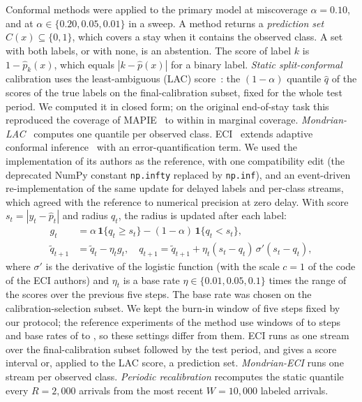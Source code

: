 Conformal methods were applied to the primary model at miscoverage $\alpha = 0.10$, and at $\alpha \in \{0.20, 0.05, 0.01\}$ in a sweep. A method returns a
\emph{prediction set} $\widehat{C}(x) \subseteq \{0,1\}$, which covers a stay when it contains the observed class. A set with both labels, or with none,
is an abstention. The score of label $k$ is $1 - \hat{p}_k(x)$, which equals $|k - \hat{p}(x)|$ for a binary label. \emph{Static split-conformal} calibration uses
the least-ambiguous (LAC) score~\cite{sadinle2019lac}: the $(1-\alpha)$ quantile $\hat{q}$ of the scores of the true
labels on the final-calibration subset, fixed for the whole test period. We computed it in closed form; on the original end-of-stay task this reproduced the coverage of MAPIE~\cite{cordier2023mapie} to within \RVStaticVsMapie{} in marginal coverage. \emph{Mondrian-LAC}~\cite{vovk2003mondrian} computes one quantile per observed class.
ECI~\cite{wu2025eci} extends adaptive conformal inference~\cite{gibbs2021aci} with an
error-quantification term. We used the implementation of its authors as the reference, with one compatibility edit (the deprecated NumPy constant \texttt{np.infty} replaced by
\texttt{np.inf}), and an event-driven re-implementation of the same update for delayed labels and per-class streams, which agreed with the reference to numerical precision at zero delay. With score $s_t = |y_t - \hat{p}_t|$ and radius $q_t$, the radius is updated after each label:
\begin{align}
g_t &= \alpha\,\mathbf{1}\{q_t \ge s_t\} - (1-\alpha)\,\mathbf{1}\{q_t < s_t\}, \label{eq:eci}\\
\tilde{q}_{t+1} &= \tilde{q}_t - \eta_t g_t, \quad q_{t+1} = \tilde{q}_{t+1} + \eta_t (s_t - q_t)\,\sigma'(s_t - q_t), \label{eq:eci-update}
\end{align}
where $\sigma'$ is the derivative of the logistic function (with the scale $c = 1$ of the code of the ECI authors) and $\eta_t$ is a base rate $\eta \in \{0.01, 0.05, 0.1\}$ times the range of the scores over the
previous five steps. The base rate was chosen on the calibration-selection subset. We kept the burn-in window of five steps fixed by our protocol; the
reference experiments of the method use windows of \RVRefBurninLo{} to \RVRefBurninHi{} steps and base rates of \RVRefEtaLo{} to \RVRefEtaHi{}, so these settings differ from them. ECI runs as one stream over the
final-calibration subset followed by the test period, and gives a score interval or, applied to the LAC score, a prediction set. \emph{Mondrian-ECI} runs one
stream per observed class. \emph{Periodic recalibration} recomputes the static quantile every $R = 2{,}000$ arrivals from the most recent $W = 10{,}000$ labeled arrivals.

